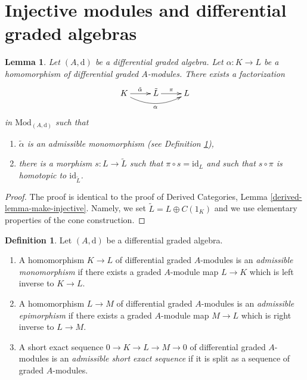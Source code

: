 \documentclass{stacks-project}
\theoremstyle{plain}
\newtheorem{lemma}[subsection]{Lemma}
\theoremstyle{definition}
\newtheorem{definition}[subsection]{Definition}
\theoremstyle{remark}
\numberwithin{equation}{subsection}
\begin{document}
\section{Injective modules and differential graded algebras}
\label{section-modules-noncommutative-differential-graded}

\begin{lemma}
\label{lemma-make-injective}
Let $(A, \text{d})$ be a differential graded algebra.
Let $\alpha : K \to L$ be a homomorphism of differential graded
$A$-modules. There exists a factorization
$$
\xymatrix{
K \ar[r]^{\tilde \alpha} \ar@/_1pc/[rr]_\alpha &
\tilde L \ar[r]^\pi & L
}
$$
in $\text{Mod}_{(A, \text{d})}$ such that
\begin{enumerate}
\item $\tilde \alpha$ is an admissible monomorphism (see
Definition \ref{definition-admissible-ses}),
\item there is a morphism $s : L \to \tilde L$
such that $\pi \circ s = \text{id}_L$ and such that
$s \circ \pi$ is homotopic to $\text{id}_{\tilde L}$.
\end{enumerate}
\end{lemma}

\begin{proof}
The proof is identical to the proof of
Derived Categories, Lemma \ref{derived-lemma-make-injective}.
Namely, we set $\tilde L = L \oplus C(1_K)$ and we use elementary
properties of the cone construction.
\end{proof}

\begin{definition}
\label{definition-admissible-ses}
Let $(A, \text{d})$ be a differential graded algebra.
\begin{enumerate}
\item A homomorphism $K \to L$ of differential graded $A$-modules
is an {\it admissible monomorphism} if there exists a graded $A$-module
map $L \to K$ which is left inverse to $K \to L$.
\item A homomorphism $L \to M$ of differential graded $A$-modules
is an {\it admissible epimorphism} if there exists a graded $A$-module
map $M \to L$ which is right inverse to $L \to M$.
\item A short exact sequence $0 \to K \to L \to M \to 0$ of differential
graded $A$-modules is an {\it admissible short exact sequence}
if it is split as a sequence of graded $A$-modules.
\end{enumerate}
\end{definition}
\end{document}
